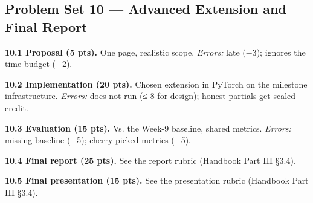 \documentclass[
]{article}
\begin{document}
\subsection{Problem Set 10 --- Advanced Extension and Final
Report}\label{problem-set-10-advanced-extension-and-final-report}

\textbf{10.1 Proposal (5 pts).} One page, realistic scope.
\emph{Errors:} late (−3); ignores the time budget (−2).

\textbf{10.2 Implementation (20 pts).} Chosen extension in PyTorch on
the milestone infrastructure. \emph{Errors:} does not run (≤ 8 for
design); honest partials get scaled credit.

\textbf{10.3 Evaluation (15 pts).} Vs. the Week-9 baseline, shared
metrics. \emph{Errors:} missing baseline (−5); cherry-picked metrics
(−5).

\textbf{10.4 Final report (25 pts).} See the report rubric (Handbook
Part III §3.4).

\textbf{10.5 Final presentation (15 pts).} See the presentation rubric
(Handbook Part III §3.4).
\end{document}
